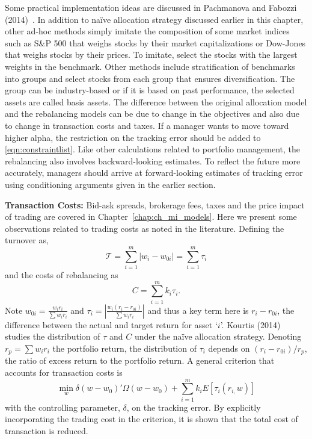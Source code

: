 Some practical implementation ideas are discussed in Pachmanova and Fabozzi (2014)~\cite{pachfab}. In addition to na\"ive allocation strategy discussed earlier in this chapter, other ad-hoc methods simply imitate the composition of some market indices such as S\&P 500 that weighs stocks by their market capitalizations or Dow-Jones that weighs stocks by their prices. To imitate, select the stocks with the largest weights in the benchmark. Other methods include stratification of benchmarks into groups and select stocks from each group that ensures diversification. The group can be industry-based or if it is based on past performance, the selected assets are called basis assets. The difference between the original allocation model and the rebalancing models can be due to change in the objectives and also due to change in transaction costs and taxes. If a manager wants to move toward higher alpha, the restriction on the tracking error should be added to \eqref{eqn:constraintlist}. Like other calculations related to portfolio management, the rebalancing also involves backward-looking estimates. To reflect the future more accurately, managers should arrive at forward-looking estimates of tracking error using conditioning arguments given in the earlier section. \twomedskip


\noindent\textbf{Transaction Costs:} Bid-ask spreads, brokerage fees, taxes and the price impact of trading are covered in Chapter~\ref{chap:ch_mi_models}. Here we present some observations related to trading costs as noted in the literature. Defining the turnover as,
	\begin{equation} \label{eqn:turnover}
	\mathcal{T}= \sum_{i=1}^m \lvert w_i - w_{0i} \rvert = \sum_{i=1}^m \tau_i
	\end{equation}
and the costs of rebalancing as
	\begin{equation} \label{eqn:rebalance}
	C= \sum_{i=1}^m k_i \tau_i.
	\end{equation}
Note $w_{0i}= \frac{w_i r_i}{\sum w_i r_i}$ and $\tau_i= \left| \frac{w_i(r_i-r_{0i})}{\sum w_ir_i} \right|$ and thus a key term here is $r_i-r_{0i}$, the difference between the actual and target return for asset `$i$'. Kourtis (2014)~\cite{kourtis} studies the distribution of $\tau$ and $C$ under the na\"ive allocation strategy. Denoting $r_p=\sum w_i r_i$ the portfolio return, the distribution of $\tau_i$ depends on $(r_i-r_{0i})/r_p$, the ratio of excess return to the portfolio return. A general criterion that accounts for transaction costs is
	\begin{equation} \label{eqn:transcostaccount}
	\min_w \delta (w-w_0)' \Omega(w-w_0) + \sum_{i=1}^m k_i E[\tau_i (r_{i,}w)]
	\end{equation}
with the controlling parameter, $\delta$, on the tracking error. By explicitly incorporating the trading cost in the criterion, it is shown that the total cost of transaction is reduced.


